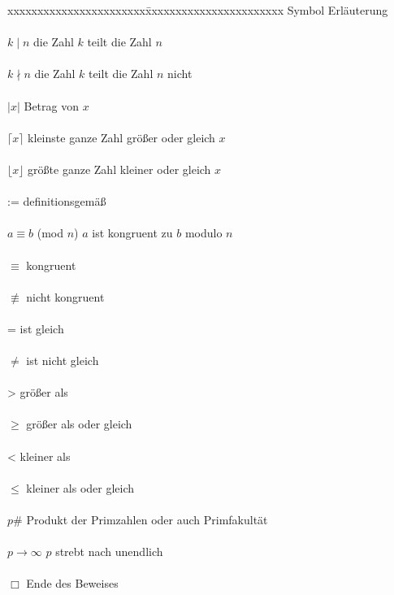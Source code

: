 \documentclass[12pt,a4paper]{article}
\theoremstyle{definition}
\begin{document}
\begin{tabbing}
xxxxxxxxxxxxxxxxxxxxxxx\=xxxxxxxxxxxxxxxxxxxxxxx\kill
\large Symbol             \> \large Erläuterung\\
\\$k \mid n$              \> die Zahl $k$ teilt die Zahl $n$\\
\\$k \nmid n$             \> die Zahl $k$ teilt die Zahl $n$ nicht\\
\\$\vert x \vert$         \> Betrag von $x$\\
\\$\lceil{x}\rceil$       \> kleinste ganze Zahl größer oder gleich $x$\\
\\$\lfloor{x}\rfloor$     \> größte ganze Zahl kleiner oder gleich $x$ \\
\\:=                      \> definitionsgemäß\\
\\$a\equiv b$ (mod $n$)   \> $a$ ist kongruent zu $b$ modulo $n$\\
\\$\equiv$                \> kongruent\\
\\$\not\equiv$            \> nicht kongruent\\
\\=                       \> ist gleich\\
\\$\neq$                  \> ist nicht gleich\\
\\>                       \> größer als\\
\\$\geq$                  \> größer als oder gleich\\
\\<                       \> kleiner als\\
\\$\leq$                  \> kleiner als oder gleich\\
\\$p\#$                   \> Produkt der Primzahlen oder auch Primfakultät\\
\\$p \to \infty$          \> $p$ strebt nach unendlich\\
\\$\Box$                  \> Ende des Beweises

\end{tabbing}
\newpage
\end{document}
